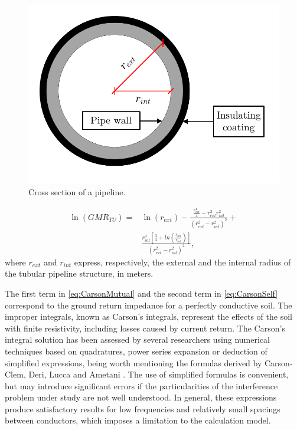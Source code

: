 \documentclass[conference]{IEEEtran}
\begin{document}
\begin{figure}[!t]
	\begin{center}
		\includegraphics[width=.8\columnwidth]{fig/Pipe.pdf}
		\caption{Cross section of a pipeline.}
		\label{fig:Pipe}
	\end{center}
\end{figure}
\begin{equation}\label{eq:GMR}
	\begin{aligned}
		\ln(GMR_{TU})=&\ln(r_{ext})-\frac{\frac{r_{ext}^4}{4}-r_{ext}^2r_{int}^2}{(r_{ext}^2-r_{int}^2)^2}+ \\
		&\frac{r_{int}^4[\frac{3}{4}+ln(\frac{r_{int}}{r_{int}})]}{(r_{ext}^2-r_{int}^2)^2},
	\end{aligned}
\end{equation}
where $r_{ext}$ and $r_{int}$ express, respectively, the external and the internal radius of the tubular pipeline structure, in meters.

The first term in \eqref{eq:CarsonMutual} and the second term in \eqref{eq:CarsonSelf} correspond to the ground return impedance for a perfectly conductive soil. The improper integrals, known as Carson's integrals, represent the effects of the soil with finite resistivity, including losses caused by current return. The Carson's integral solution has been assessed by several researchers using numerical techniques based on quadratures, power series expansion or deduction of simplified expressions, being worth mentioning the formulas derived by Carson-Clem, Deri, Lucca and Ametani \cite{CIGREWG36,DeriA.Tevan1981,Lucca1994,Ametani2009}. The use of simplified formulas is convenient, but may introduce significant errors if the particularities of the interference problem under study are not well understood. In general, these expressions produce satisfactory results for low frequencies and relatively small spacings between conductors, which imposes a limitation to the calculation model.
\end{document}
